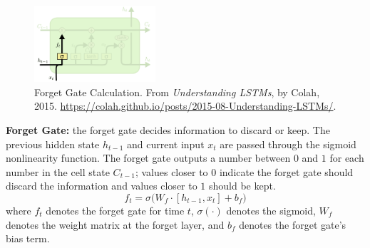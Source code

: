 \begin{program}
\begin{figure}
\vspace{-20pt}
\begin{center}
    \includegraphics[width=0.4\textwidth]{imgs/lstm_forgetGate.png}
\end{center}
\vspace{-20pt}
\caption{\footnotesize Forget Gate Calculation. From \emph{Understanding LSTMs}, by Colah, 2015. \url{https://colah.github.io/posts/2015-08-Understanding-LSTMs/}. }
\vspace{-5pt}
\label{fig:forgetGate}
\end{figure}

\textbf{Forget Gate: } the forget gate decides information to discard or keep. The previous hidden state $h_{t-1}$ and current input $x_t$ are passed through the sigmoid nonlinearity function. The forget gate outputs a number between $0$ and $1$ for each number in the cell state $C_{t-1}$; values closer to $0$ indicate the forget gate should discard the information and values closer to $1$ should be kept. 
$$
f_t = \sigma \Big( W_f \cdot [h_{t-1}, x_t] + b_f \Big)
$$
where $f_t$ denotes the forget gate for time $t$, $\sigma(\cdot)$ denotes the sigmoid, $W_f$ denotes the weight matrix at the forget layer, and $b_f$ denotes the forget gate's bias term. 
\end{program}


